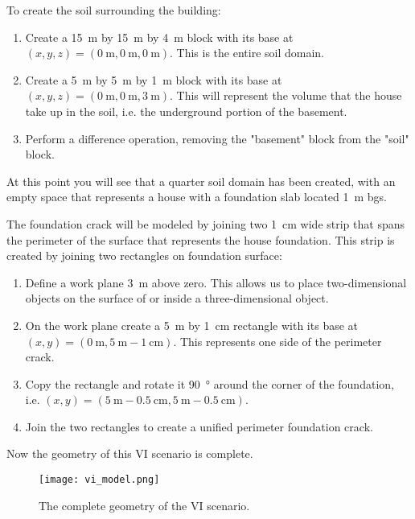 To create the soil surrounding the building:
\begin{enumerate}
  \item Create a \SI{15}{\metre} by \SI{15}{\metre} by \SI{4}{\metre} block with its base at $(x, y, z) = (\SI{0}{\metre},\SI{0}{\metre},\SI{0}{\metre})$. This is the entire soil domain.
  \item Create a \SI{5}{\metre} by \SI{5}{\metre} by \SI{1}{\metre} block with its base at $(x, y, z) = (\SI{0}{\metre},\SI{0}{\metre},\SI{3}{\metre})$. This will represent the volume that the house take up in the soil, i.e. the underground portion of the basement.
  \item Perform a difference operation, removing the "basement" block from the "soil" block.
\end{enumerate}
At this point you will see that a quarter soil domain has been created, with an empty space that represents a house with a foundation slab located \SI{1}{\metre} bgs.\par

The foundation crack will be modeled by joining two  \SI{1}{\centi\metre} wide strip that spans the perimeter of the surface that represents the house foundation.
This strip is created by joining two rectangles on foundation surface:
\begin{enumerate}
  \item Define a work plane \SI{3}{\metre} above zero. This allows us to place two-dimensional objects on the surface of or inside a three-dimensional object.
  \item On the work plane create a \SI{5}{\metre} by \SI{1}{\centi\metre} rectangle with its base at $(x, y) = (\SI{0}{\metre},\SI{5}{\metre} - \SI{1}{\centi\metre})$. This represents one side of the perimeter crack.
  \item Copy the rectangle and rotate it \SI{90}{\degree} around the corner of the foundation, i.e. $(x, y) = (\SI{5}{\metre} - \SI{0.5}{\centi\metre},\SI{5}{\metre} - \SI{0.5}{\centi\metre})$.
  \item Join the two rectangles to create a unified perimeter foundation crack.
\end{enumerate}
Now the geometry of this VI scenario is complete.\par

\begin{figure}[htb!]
  \texttt{[image: vi\_model.png]}
  \caption{The complete geometry of the VI scenario.}
  \label{fig:geometry}
\end{figure}
